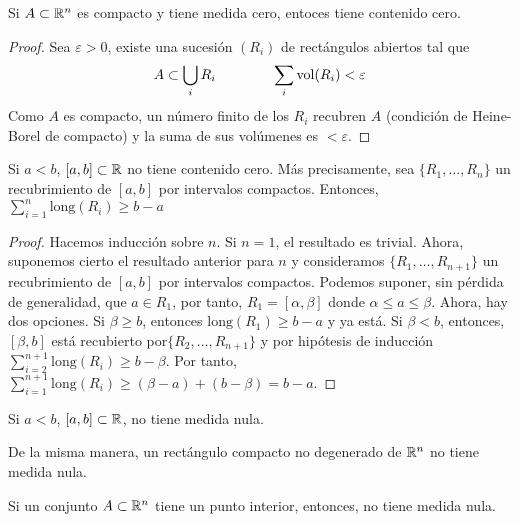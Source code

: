 \begin{prop}
    Si $A \subset \mathbb{R}^n$ es compacto y tiene medida cero, entoces tiene contenido
    cero.
\end{prop}
\begin{proof}
    Sea $\varepsilon > 0$, existe una sucesión $(R_i)$ de rectángulos abiertos tal
    que
    \[
        A \subset \bigcup_i R_i \qquad \qquad \sum_i \operatorname{vol}(R_i) < \varepsilon
    \]
    Como $A$ es compacto, un número finito de los $R_i$ recubren $A$ (condición
    de Heine-Borel de compacto) y la suma de sus volúmenes es $< \varepsilon$.
\end{proof}

\begin{lema}
    Si $a < b$, $[a,b] \subset \mathbb{R}$ no tiene contenido cero. Más precisamente,
    sea $\{R_1,\dots,R_n\}$ un recubrimiento de $[a,b]$ por intervalos compactos.
    Entonces, $\sum\limits^{n}_{i=1} \text{long}(R_i) \geq b-a$
\end{lema}
\begin{proof}
    Hacemos inducción sobre $n$. Si $n = 1$, el resultado es trivial. Ahora,
    suponemos cierto el resultado anterior para $n$ y consideramos
    $\{R_1,\dots,R_{n+1}\}$ un recubrimiento de $[a,b]$ por intervalos compactos.
    Podemos suponer, sin p\'erdida de generalidad, que $a \in R_1$, por tanto,
    $R_1 = [\alpha,\beta]$ donde $\alpha \leq a \leq \beta$. Ahora, hay dos
    opciones. Si $\beta \geq b$, entonces $\text{long}(R_1) \geq b - a$ y ya está.
    Si $\beta< b$, entonces, $[\beta,b]$ está recubierto por$\{R_2,\dots,R_{n+1}\}$
    y por hipótesis de inducción $\sum\limits^{n+1}_{i=2} \text{long}(R_i) \geq
    b - \beta$. Por tanto, $\sum\limits^{n+1}_{i=1} \text{long}(R_i) \geq
    (\beta - a) + (b - \beta) = b - a$.
\end{proof}
\begin{col*}
    Si $a < b$, $[a,b]\subset \mathbb{R}$, no tiene medida nula.
\end{col*}
\begin{obs*}
    De la misma manera, un rectángulo compacto no degenerado de $\mathbb{R}^n$ no
    tiene medida nula.
\end{obs*}
\begin{col*}
    Si un conjunto $A \subset \mathbb{R}^n$ tiene un punto interior, entonces, no tiene
    medida nula.
\end{col*}

